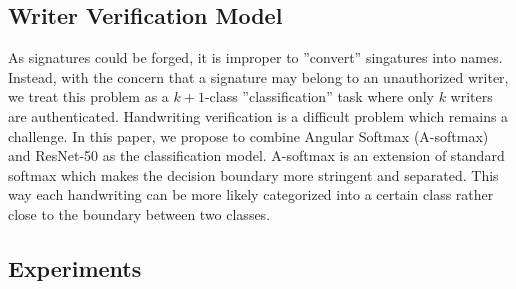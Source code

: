 \documentclass[sigconf]{acmart}
\begin{document}
\subsection{Writer Verification Model}
As signatures could be forged, it is improper to ''convert'' singatures into names. Instead, with the concern that a signature may belong to an unauthorized writer, we treat this problem as a $k+1$-class ''classification'' task where only $k$ writers are authenticated. Handwriting verification is a difficult problem which remains a challenge. In this paper, we propose to combine Angular Softmax (A-softmax) \cite{liu2017sphereface} and ResNet-50 \cite{he2016deep} as the classification model. A-softmax is an extension of standard softmax which makes the decision boundary more stringent and separated. This way each handwriting can be more likely categorized into a certain class rather close to the boundary between two classes. 

\subsection{Experiments}
\end{document}
